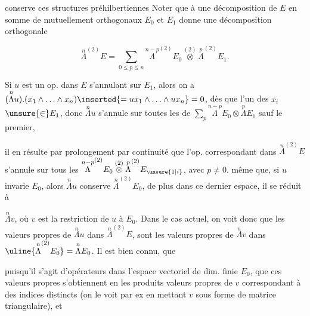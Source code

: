 conserve ces structures préhilbertiennes  Noter que à une décomposition de $E$  en somme de  mutuellement orthogonaux $E_0$ et $E_1$ donne une décomposition orthogonale

\[
\overset{n}{\Lambda}^{(2)}E=\sum_{0\leq p\leq n}\overset{n-p}{\Lambda}^{(2)}E_0\overset{(2)}{\otimes}\overset{p}{\Lambda}^{(2)}E_1 .
\]

Si $u$ est un op. dans $E$ s'annulant sur $E_1$, alors on a $(\overset{n}{\Lambda}u).(x_1\wedge\ldots\wedge x_n)\inserted{=ux_1\wedge\ldots\wedge ux_n}=0$,  dès que l'un  des $x_i$  $\unsure{\in} E_1$, donc $\overset{n}{\Lambda}u$ s'annule sur  toutes les   de $\sum_p\overset{n-p}{\Lambda}E_0\otimes\overset{p}{\Lambda}E_1$ sauf le premier, 

il en résulte par prolongement par continuité que l'op. correspondant dans $\overset{n}{\Lambda}^{(2)}E$ s'annule sur tous les $\overset{n-p}{\Lambda}^{(2)}E_0\overset{(2)}{\otimes}\overset{p}{\Lambda}^{(2)}E_{\unsure{1|i}}$,  avec $p\neq0$.   même que, si $u$ invarie $E_0$, alors $\overset{n}{\Lambda}u$ conserve $\overset{n}{\Lambda}^{(2)}E_0$, de plus dans   ce dernier espace, il se réduit à

$\overset{n}{\Lambda}v$, où $v$ est la restriction de $u$ à $E_0$. Dans le cas actuel,   on voit donc que  les valeurs propres de $\overset{n}{\Lambda}u$ dans $\overset{n}{\Lambda}^{(2)}E$, sont les valeurs propres de $\overset{n}{\Lambda}v$ dans $\uline{\overset{n}{\Lambda}^{(2)}E_0}=\overset{n}{\Lambda}E_0$. Il est bien connu, que

  puisqu'il s'agit d'opérateurs dans l'espace vectoriel de dim. finie $E_0$, que ces valeurs propres s'obtiennent en   les produits   valeurs propres de $v$ correspondant à des indices distincts (on le voit par ex en mettant $v$ sous forme de matrice triangulaire), et
